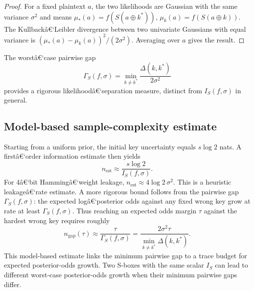 \documentclass[referee,lineno,pdflatex,sn-mathphys-num]{sn-jnl}
\theoremstyle{thmstylethree}
\theoremstyle{thmstyletwo}
\theoremstyle{thmstyleone}
\begin{document}
\begin{proof}
  For a fixed plaintext $a$, the two likelihoods are Gaussian with the same
  variance $\sigma^2$ and means $\mu_*(a)=f(S(a\oplus k^*))$,
  $\mu_k(a)=f(S(a\oplus k))$.  The Kullbackâ€‘Leibler divergence between two
  univariate Gaussians with equal variance is $(\mu_*(a)-\mu_k(a))^2/(2\sigma^2)$.
  Averaging over $a$ gives the result.
\end{proof}

The worstâ€‘case pairwise gap
\begin{equation}\label{eq:gamma-gap}
  \Gamma_S(f,\sigma) = \min_{k\neq k^*} \frac{\Delta(k,k^*)}{2\sigma^2}
\end{equation}
provides a rigorous likelihoodâ€‘separation measure, distinct from $I_S(f,\sigma)$
in general.

\subsection{Model-based sample-complexity estimate}\label{subsec:convergence}

Starting from a uniform prior, the initial key uncertainty equals $s\log2$ nats.
A firstâ€‘order information estimate then yields
\begin{equation}\label{eq:sample-estimate}
  n_{\mathrm{est}} \approx \frac{s\log2}{I_S(f,\sigma)}.
\end{equation}
For 4â€‘bit Hammingâ€‘weight leakage, $n_{\mathrm{est}}\approx 4\log2\,\sigma^2$.
This is a heuristic leakageâ€‘rate estimate.  A more rigorous bound follows from
the pairwise gap $\Gamma_S(f,\sigma)$: the expected logâ€‘posterior odds against
any fixed wrong key grow at rate at least $\Gamma_S(f,\sigma)$.  Thus reaching
an expected odds margin $\tau$ against the hardest wrong key requires roughly
\begin{equation}\label{eq:gap-sample-estimate}
  n_{\mathrm{gap}}(\tau)
  \approx \frac{\tau}{\Gamma_S(f,\sigma)}
  = \frac{2\sigma^2\tau}{\min_{k\neq k^*}\Delta(k,k^*)}.
\end{equation}
This model-based estimate links the minimum pairwise gap to a trace budget for
expected posterior-odds growth. Two S-boxes with the same scalar $I_S$ can lead
to different worst-case posterior-odds growth when their minimum pairwise gaps
differ.

\end{document}
